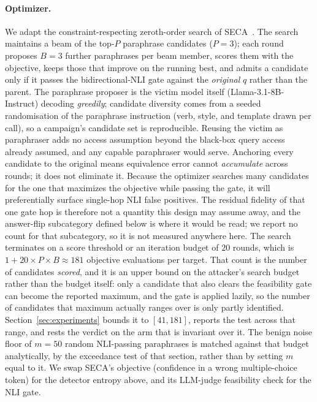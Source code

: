 \paragraph{Optimizer.}
We adapt the constraint-respecting zeroth-order search of
SECA~\citep{liang2025seca}. The search maintains a beam of the top-$P$ paraphrase
candidates ($P{=}3$); each round proposes $B{=}3$ further paraphrases per beam member,
scores them with the objective, keeps those that improve on the
running best, and admits a candidate only if it passes the bidirectional-NLI gate
against the \emph{original} $q$ rather than the parent. The paraphrase proposer is the
victim model itself (Llama-3.1-8B-Instruct) decoding \emph{greedily}; candidate diversity
comes from a seeded randomisation of the paraphrase instruction (verb, style, and template
drawn per call), so a campaign's candidate set is reproducible. Reusing the victim as
paraphraser adds no access assumption beyond the black-box query access already assumed,
and any capable paraphraser would serve. Anchoring every candidate
to the original means equivalence error cannot \emph{accumulate} across rounds;
it does not eliminate it. Because the optimizer searches many candidates for the
one that maximizes the objective while passing the gate, it will preferentially
surface single-hop NLI false positives. The residual fidelity of that one
gate hop is therefore not a quantity this design may assume away, and the answer-flip
subcategory defined below is where it would be read; we report no count for that
subcategory, so it is not measured anywhere here. The search terminates on a score threshold or an
iteration budget of $20$ rounds, which is $1 + 20 \times P \times B \approx 181$ objective
evaluations per target. That count is the number of candidates \emph{scored}, and it is an
upper bound on the attacker's search budget rather than the budget itself: only a candidate
that also clears the feasibility gate can become the reported maximum, and the gate is
applied lazily, so the number of candidates that maximum actually ranges over is only partly
identified. Section~\ref{sec:experiments} bounds it to $[41,181]$, reports the test across
that range, and rests the verdict on the arm that is invariant over it. The benign noise
floor of $m{=}50$ random NLI-passing paraphrases is matched against that budget
analytically, by the exceedance test of that section, rather than by setting $m$ equal to
it. We
swap SECA's objective (confidence in a wrong multiple-choice token) for the detector entropy
above, and its LLM-judge feasibility check for the NLI gate.

